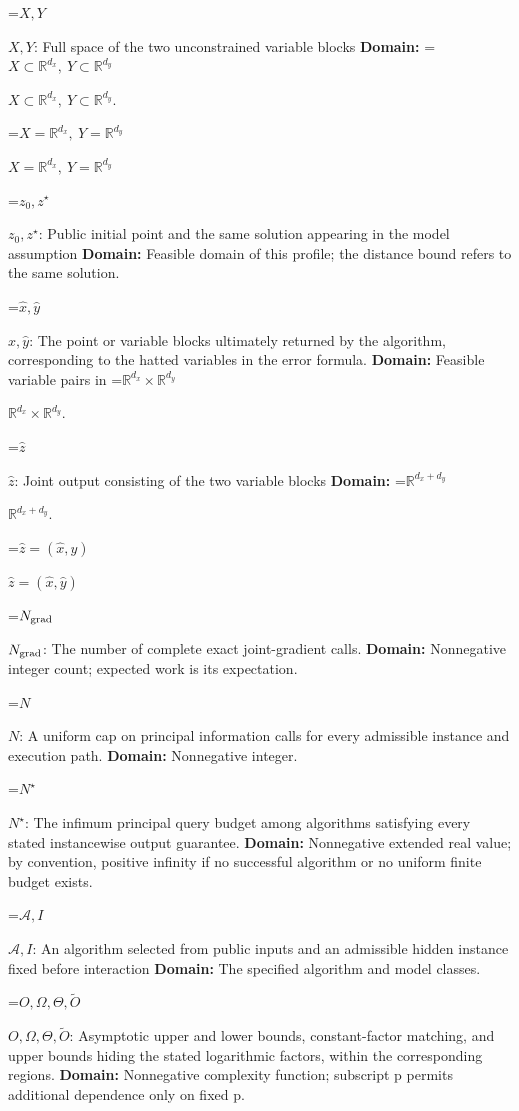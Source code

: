 \documentclass[10pt,a4paper]{article}
\newcommand{\AtlasMath}[1]{\par\begingroup\centering\setbox0=\hbox{$\displaystyle #1$}\ifdim\wd0>1.4\linewidth\typeout{ATLAS WIDE FORMULA: \the\wd0}\fi\ifdim\wd0>\linewidth\resizebox{\linewidth}{!}{\box0}\else\box0\fi\par\endgroup}
\newcommand{\AtlasInlineMath}[1]{\begingroup\setbox0=\hbox{$#1$}\ifdim\wd0>.4\linewidth\endgroup\AtlasMath{#1}\else\endgroup$#1$\fi}
\begin{document}
\AtlasInlineMath{X,Y}: Full space of the two unconstrained variable blocks \textbf{Domain:} \AtlasInlineMath{X\subset\mathbb R^{d_x},\ Y\subset\mathbb R^{d_y}}.



\AtlasInlineMath{X=\mathbb R^{d_x},\ Y=\mathbb R^{d_y}}



\AtlasInlineMath{z_0,z^\star}: Public initial point and the same solution appearing in the model assumption \textbf{Domain:} Feasible domain of this profile; the distance bound refers to the same solution.



\AtlasInlineMath{\widehat x,\widehat y}: The point or variable blocks ultimately returned by the algorithm, corresponding to the hatted variables in the error formula. \textbf{Domain:} Feasible variable pairs in \AtlasInlineMath{\mathbb R^{d_x}\times\mathbb R^{d_y}}.



\AtlasInlineMath{\widehat z}: Joint output consisting of the two variable blocks \textbf{Domain:} \AtlasInlineMath{\mathbb R^{d_x+d_y}}.



\AtlasInlineMath{\widehat z=(\widehat x,\widehat y)}



\AtlasInlineMath{N_{\rm grad}}: The number of complete exact joint-gradient calls. \textbf{Domain:} Nonnegative integer count; expected work is its expectation.



\AtlasInlineMath{N}: A uniform cap on principal information calls for every admissible instance and execution path. \textbf{Domain:} Nonnegative integer.



\AtlasInlineMath{N^\star}: The infimum principal query budget among algorithms satisfying every stated instancewise output guarantee. \textbf{Domain:} Nonnegative extended real value; by convention, positive infinity if no successful algorithm or no uniform finite budget exists.



\AtlasInlineMath{\mathcal A,I}: An algorithm selected from public inputs and an admissible hidden instance fixed before interaction \textbf{Domain:} The specified algorithm and model classes.



\AtlasInlineMath{O,\Omega,\Theta,\widetilde O}: Asymptotic upper and lower bounds, constant-factor matching, and upper bounds hiding the stated logarithmic factors, within the corresponding regions. \textbf{Domain:} Nonnegative complexity function; subscript p permits additional dependence only on fixed p.
\end{document}
